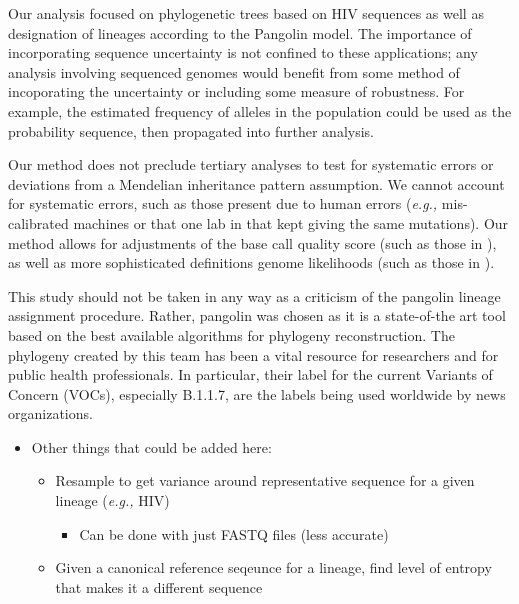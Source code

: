 \documentclass[
]{article}
\providecommand{\tightlist}{%
  \setlength{\itemsep}{0pt}\setlength{\parskip}{0pt}}
\newcommand{\eg}{\textit{e.g.,}\xspace}
\begin{document}
Our analysis focused on phylogenetic trees based on HIV sequences as
well as designation of lineages according to the Pangolin model. The
importance of incorporating sequence uncertainty is not confined to
these applications; any analysis involving sequenced genomes would
benefit from some method of incoporating the uncertainty or including
some measure of robustness. For example, the estimated frequency of
alleles in the population could be used as the probability sequence,
then propagated into further analysis.

Our method does not preclude tertiary analyses to test for systematic
errors or deviations from a Mendelian inheritance pattern assumption. We
cannot account for systematic errors, such as those present due to human
errors (\eg mis-calibrated machines or that one lab in \citet{blank}
that kept giving the same mutations). Our method allows for adjustments
of the base call quality score (such as those in \citet{blank}), as well
as more sophisticated definitions genome likelihoods (such as those in
\citet{blank2}).

This study should not be taken in any way as a criticism of the pangolin
lineage assignment procedure. Rather, pangolin was chosen as it is a
state-of-the art tool based on the best available algorithms for
phylogeny reconstruction. The phylogeny created by this team has been a
vital resource for researchers and for public health professionals. In
particular, their label for the current Variants of Concern (VOCs),
especially B.1.1.7, are the labels being used worldwide by news
organizations.

\begin{itemize}
\tightlist
\item
  Other things that could be added here:

  \begin{itemize}
  \tightlist
  \item
    Resample to get variance around representative sequence for a given
    lineage (\eg HIV)

    \begin{itemize}
    \tightlist
    \item
      Can be done with just FASTQ files (less accurate)
    \end{itemize}
  \item
    Given a canonical reference seqeunce for a lineage, find level of
    entropy that makes it a different sequence
  \end{itemize}
\end{itemize}
\end{document}

